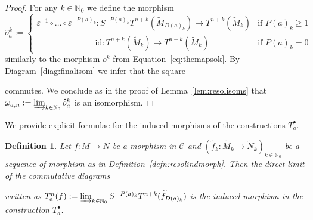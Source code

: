 \documentclass[12pt,a4paper]{article}
\numberwithin{equation}{section}
\newtheorem{defn}[thm]{Definition}
\theoremstyle{nonumberplain}
\newtheorem{proof}{Proof}
\begin{document}
\begin{proof}
For any $k \in \mathbb{N}_0$ we define the morphism
\[ \widehat{o}_a^k := \begin{cases} \varepsilon^{-1} \circ {} \dots {} \circ \varepsilon^{-P(a)_k}: S^{-P(a)_k}T^{n+k}(\widetilde{M}_{D(a)_k}) \rightarrow T^{n+k}(\widetilde{M}_k) &\text{if } P(a)_k \geq 1 \\ \qquad \qquad \qquad \quad \mathrm{id}: T^{n+k}(\widetilde{M}_k) \rightarrow T^{n+k}(\widetilde{M}_k) &\text{if } P(a)_k = 0 \end{cases} \]
similarly to the morphism $o^k$ from Equation~\ref{eq:themapsok}. By Diagram~\ref{diag:finalisom} we infer that the square
\begin{center}
\end{center}
commutes. We conclude as in the proof of Lemma~\ref{lem:resolisoms} that $\omega_{a, n} := \varinjlim_{k \in \mathbb{N}_0} \widehat{o}_a^k$ is an isomorphism.
\end{proof}

We provide explicit formulae for the induced morphisms of the constructions $T_a^{\bullet}$.

\begin{defn}\label{defn:countmanyconstrsindmorph}
Let $f: M \rightarrow N$ be a morphism in $\mathcal{C}$ and $(\widetilde{f}_k: \widetilde{M}_k \rightarrow \widetilde{N}_k)_{k \in \mathbb{N}_0}$ be a sequence of morphism as in Definition~\ref{defn:resolindmorph}. Then the direct limit of the commutative diagrams
\begin{center}
\end{center}
written as $T_a^n(f) := \varinjlim_{k \in \mathbb{N}_0} S^{-P(a)_k}T^{n+k}(\widetilde{f}_{D(a)_k})$ is the induced morphism in the construction $T_a^{\bullet}$.
\end{defn}
\end{document}
